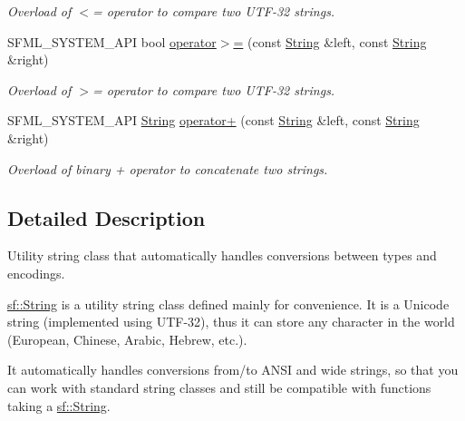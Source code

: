 \begin{DoxyCompactItemize}
\begin{DoxyCompactList}\small\item\em Overload of $<$= operator to compare two U\+T\+F-\/32 strings. \end{DoxyCompactList}\item 
S\+F\+M\+L\+\_\+\+S\+Y\+S\+T\+E\+M\+\_\+\+A\+PI bool \mbox{\hyperlink{classsf_1_1_string_a8d2979d7829d6616330a768956f251e1}{operator$>$=}} (const \mbox{\hyperlink{classsf_1_1_string}{String}} \&left, const \mbox{\hyperlink{classsf_1_1_string}{String}} \&right)
\begin{DoxyCompactList}\small\item\em Overload of $>$= operator to compare two U\+T\+F-\/32 strings. \end{DoxyCompactList}\item 
S\+F\+M\+L\+\_\+\+S\+Y\+S\+T\+E\+M\+\_\+\+A\+PI \mbox{\hyperlink{classsf_1_1_string}{String}} \mbox{\hyperlink{classsf_1_1_string_a55ef2bf7dc6b295ef7127b0bc1e58760}{operator+}} (const \mbox{\hyperlink{classsf_1_1_string}{String}} \&left, const \mbox{\hyperlink{classsf_1_1_string}{String}} \&right)
\begin{DoxyCompactList}\small\item\em Overload of binary + operator to concatenate two strings. \end{DoxyCompactList}\end{DoxyCompactItemize}


\subsection{Detailed Description}
Utility string class that automatically handles conversions between types and encodings. 

\begin{DoxyVerb}\end{DoxyVerb}


\mbox{\hyperlink{classsf_1_1_string}{sf\+::\+String}} is a utility string class defined mainly for convenience. It is a Unicode string (implemented using U\+T\+F-\/32), thus it can store any character in the world (European, Chinese, Arabic, Hebrew, etc.).

It automatically handles conversions from/to A\+N\+SI and wide strings, so that you can work with standard string classes and still be compatible with functions taking a \mbox{\hyperlink{classsf_1_1_string}{sf\+::\+String}}.


